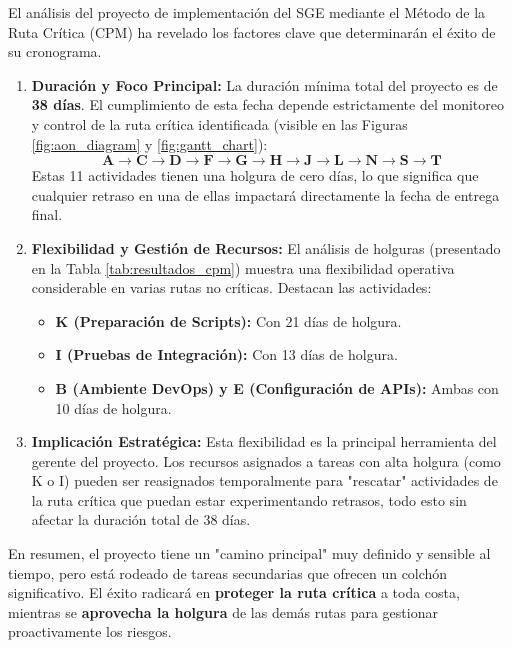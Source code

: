 \documentclass[a4paper,9pt]{article}
\begin{document}
El análisis del proyecto de implementación del SGE mediante el Método de la Ruta Crítica (CPM) ha revelado los factores clave que determinarán el éxito de su cronograma.

\begin{enumerate}
    \item \textbf{Duración y Foco Principal:} La duración mínima total del proyecto es de \textbf{38 días}. El cumplimiento de esta fecha depende estrictamente del monitoreo y control de la ruta crítica identificada (visible en las Figuras \ref{fig:aon_diagram} y \ref{fig:gantt_chart}):
    $$ \mathbf{A \rightarrow C \rightarrow D \rightarrow F \rightarrow G \rightarrow H \rightarrow J \rightarrow L \rightarrow N \rightarrow S \rightarrow T} $$
    Estas 11 actividades tienen una holgura de cero días, lo que significa que cualquier retraso en una de ellas impactará directamente la fecha de entrega final.

    \item \textbf{Flexibilidad y Gestión de Recursos:} El análisis de holguras (presentado en la Tabla \ref{tab:resultados_cpm}) muestra una flexibilidad operativa considerable en varias rutas no críticas. Destacan las actividades:
    \begin{itemize}
        \item \textbf{K (Preparación de Scripts):} Con 21 días de holgura.
        \item \textbf{I (Pruebas de Integración):} Con 13 días de holgura.
        \item \textbf{B (Ambiente DevOps) y E (Configuración de APIs):} Ambas con 10 días de holgura.
    \end{itemize}

    \item \textbf{Implicación Estratégica:} Esta flexibilidad es la principal herramienta del gerente del proyecto. Los recursos asignados a tareas con alta holgura (como K o I) pueden ser reasignados temporalmente para "rescatar" actividades de la ruta crítica que puedan estar experimentando retrasos, todo esto sin afectar la duración total de 38 días.
\end{enumerate}

En resumen, el proyecto tiene un "camino principal" muy definido y sensible al tiempo, pero está rodeado de tareas secundarias que ofrecen un colchón significativo. El éxito radicará en \textbf{proteger la ruta crítica} a toda costa, mientras se \textbf{aprovecha la holgura} de las demás rutas para gestionar proactivamente los riesgos.
\end{document}
